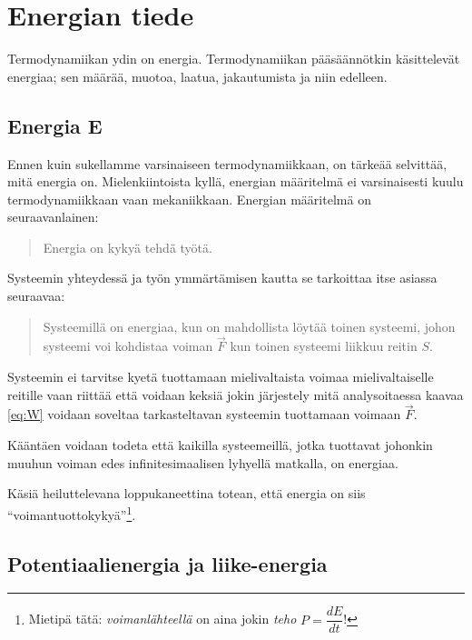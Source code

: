 \documentclass[12pt,a4paper,finnish]{book}
\begin{document}
\chapter{Energian tiede} %

Termodynamiikan ydin on energia. Termodynamiikan pääsäännötkin käsittelevät energiaa; sen määrää, 
muotoa, laatua, jakautumista ja niin edelleen.

\section{Energia E} %

Ennen kuin sukellamme varsinaiseen termodynamiikkaan, on tärkeää selvittää, mitä energia on. Mielenkiintoista 
kyllä, energian määritelmä ei varsinaisesti kuulu termodynamiikkaan vaan mekaniikkaan. Energian määritelmä on 
seuraavanlainen:

\begin{quote}
 Energia on kykyä tehdä työtä.
\end{quote}

Systeemin yhteydessä ja työn ymmärtämisen kautta se tarkoittaa itse asiassa seuraavaa:

\begin{quotation}
 Systeemillä on energiaa, kun on mahdollista löytää toinen systeemi, johon systeemi voi kohdistaa 
 voiman $\vec{F}$ kun toinen systeemi liikkuu reitin $S$.
\end{quotation}

Systeemin ei tarvitse kyetä tuottamaan mielivaltaista voimaa mielivaltaiselle reitille vaan riittää että 
voidaan keksiä jokin järjestely mitä analysoitaessa kaavaa \ref{eq:W} voidaan soveltaa tarkasteltavan 
systeemin tuottamaan voimaan $\vec{F}$.

Kääntäen voidaan todeta että kaikilla systeemeillä, jotka tuottavat johonkin muuhun voiman edes 
infinitesimaalisen lyhyellä matkalla, on energiaa.

Käsiä heiluttelevana loppukaneettina totean, että energia on siis ``voimantuottokykyä''\footnote{
Mietipä tätä: \textit{voimanlähteellä} on aina jokin \textit{teho} $P = \dfrac{dE}{dt}$!}.

\section{Potentiaalienergia ja liike-energia} %
\end{document}
